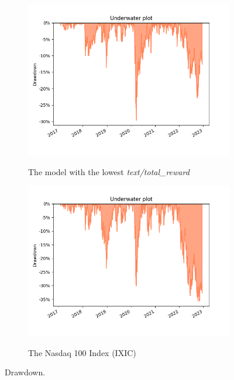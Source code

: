 \documentclass[../xlapes02]{subfiles}
\begin{document}
\begin{figure}[h!]
        \vspace{0.5cm}

        \begin{subfigure}[t]{\experimentimgwidth\textwidth}
            \centering
            \includegraphics[width=\linewidth]{image/figure/drawdown_underwater_min}
            \label{fig:drawdown_underwater_min}
            \caption{The model with the lowest \emph{text/total\_reward}}
        \end{subfigure}
        \hfill
        \begin{subfigure}[t]{\experimentimgwidth\textwidth}
            \centering
            \includegraphics[width=\linewidth]{image/figure/drawdown_underwater_ixic}
            \label{fig:drawdown_underwater_ixic}
            \caption{The Nasdaq 100 Index (IXIC)}
        \end{subfigure}

        \caption{Drawdown.}
        \label{fig:drawdown}
    \end{figure}
\end{document}
